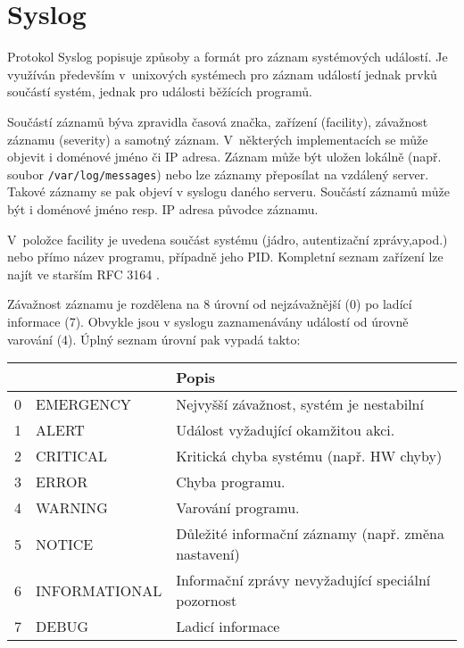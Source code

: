 \section{Syslog}
\label{syslog}

Protokol Syslog \cite{rfc5424} popisuje způsoby a formát pro záznam systémových událostí. Je využíván
 především v~unixových systémech pro záznam událostí jednak prvků součástí systém, jednak pro
 události běžících programů. 

Součástí záznamů býva zpravidla časová značka, zařízení (facility), závažnost záznamu (severity)
 a samotný záznam. V~některých implementacích se může objevit i doménové jméno či IP adresa. Záznam
 může být uložen lokálně (např. soubor \verb|/var/log/messages|) nebo lze záznamy přeposílat
 na vzdálený server. Takové záznamy se pak objeví v syslogu daného serveru. Součástí záznamů může být
 i doménové jméno resp. IP adresa původce záznamu.

V~položce facility je uvedena součást systému (jádro, autentizační zprávy,apod.) nebo
 přímo název programu, případně jeho PID. Kompletní seznam zařízení lze najít ve starším RFC 3164
 \cite{rfc3164}.

Závažnost záznamu je rozdělena na 8 úrovní od nejzávažnější (0) po ladící informace (7). Obvykle
 jsou v syslogu zaznamenávány událostí od úrovně varování (4). Úplný seznam úrovní pak vypadá takto:
\begin{table}[!h]
	\centering
	\begin{tabular}[!h]{|c|l|l|}
	\hline
	\shortstack{Závažnost} & & Popis \\
	\hline
	0 & EMERGENCY & Nejvyšší závažnost, systém je nestabilní\\
	1 & ALERT & Událost vyžadující okamžitou akci.\\
	2 & CRITICAL & Kritická chyba systému (např. HW chyby) \\
	3 & ERROR & Chyba programu.\\
	4 & WARNING & Varování programu.\\
	5 & NOTICE & Důležité informační záznamy (např. změna nastavení)\\
	6 & INFORMATIONAL & Informační zprávy nevyžadující speciální pozornost\\
	7 & DEBUG & Ladicí informace\\
	\hline
	\end{tabular}
\end{table}


